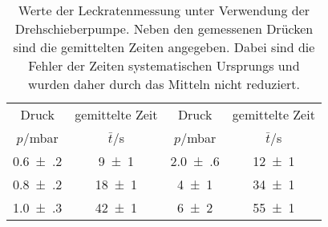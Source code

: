 \begin{table}[!h]
	\centering
	\begin{tabular}{cccc}
		\toprule
		Druck & gemittelte Zeit & Druck & gemittelte Zeit\\
		$p$/\si{mbar} & $\bar{t}$/\si{s} & $p$/\si{mbar} & $\bar{t}$/\si{s}\\
\midrule
		\num{0.6(2)} & \num{9(1)} & \num{2.0(6)} & \num{12(1)}\\
		\num{0.8(2)} & \num{18(1)} & \num{4(1)} & \num{34(1)}\\
		\num{1.0(3)} & \num{42(1)} & \num{6(2)} & \num{55(1)}\\
		\bottomrule
	\end{tabular}
	\caption{Werte der Leckratenmessung unter Verwendung der Drehschieberpumpe.
                        Neben den gemessenen Drücken sind die gemittelten Zeiten angegeben. 
                        Dabei sind die Fehler der Zeiten systematischen Ursprungs und wurden 
                        daher durch das Mitteln nicht reduziert. \label{tab:}}
\end{table}
